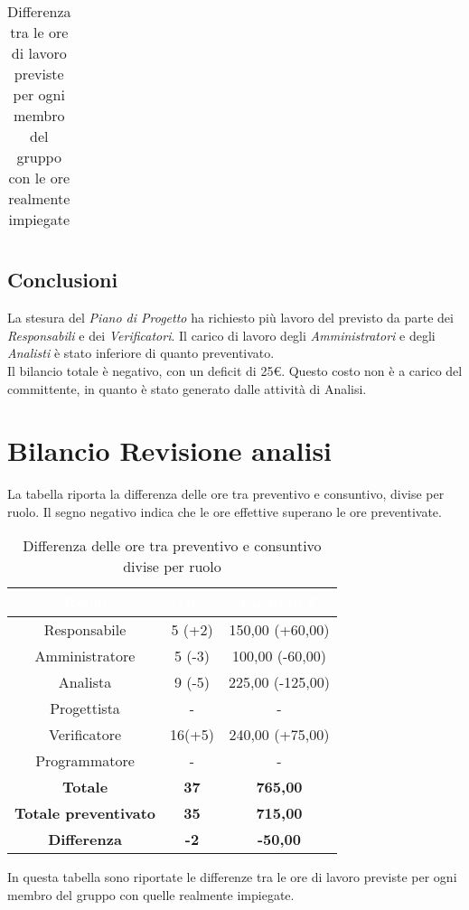\begin{flushleft}
\begin{table}[!h]
\begin{center}
\begin{tabularx}{\textwidth}{|c|cccccc|c|}
 		\end{tabularx}
 		\caption{Differenza tra le ore di lavoro previste per ogni membro del gruppo con le ore realmente impiegate }
 		\end{center}
	 \end{table}
    \subsection{Conclusioni}
    La stesura del \textit{Piano di Progetto} ha richiesto più lavoro del previsto da parte dei \textit{Responsabili} e dei \textit{Verificatori}. Il carico di lavoro degli \textit{Amministratori} e degli \textit{Analisti} è stato inferiore di quanto preventivato.\\ Il bilancio totale è negativo, con un deficit di 25\euro. Questo costo non è a carico del committente, in quanto è stato generato dalle attività di Analisi.
    
    \newpage
    
\section{Bilancio Revisione analisi}\label{BilRevAn}
La tabella riporta la differenza delle ore tra preventivo e consuntivo, divise per ruolo. Il segno negativo indica che le ore effettive superano le ore preventivate.  
  
\begin{table}[!h]
	\begin{center}
		\begin{tabular}{ccc}
			\rowcolor{coolblack}
			\hline
			\textcolor{white}{Ruolo} & \textcolor{white}{Ore} & \textcolor{white}{Costo in \euro}\\
			\hline
			Responsabile   & 5 (+2)  &  150,00 (+60,00) 	\\ 
			Amministratore & 5 (-3)  &  100,00 (-60,00) 	\\ 
			Analista       & 9 (-5)  &  225,00 (-125,00)   	\\ 
			Progettista    & -  	 &  - 					\\ 
			Verificatore   & 16(+5)  &  240,00 (+75,00) 	\\ 
			Programmatore  & -       &  -    		 		\\ \hline
			\textbf{Totale}& \textbf{37} & \textbf{765,00}	\\ \hline 
			\textbf{Totale preventivato}& \textbf{35} & \textbf{715,00}\\ \hline 
			\textbf{Differenza}& \textbf{-2} & \textbf{-50,00 }	\\ \hline  
		\end{tabular}
		\caption{Differenza delle ore tra preventivo e consuntivo divise per ruolo} 
	\end{center}
\end{table}
  \clearpage
In questa tabella  sono riportate le differenze tra le ore di lavoro previste per ogni membro del gruppo con quelle realmente impiegate.\\


\end{flushleft}
